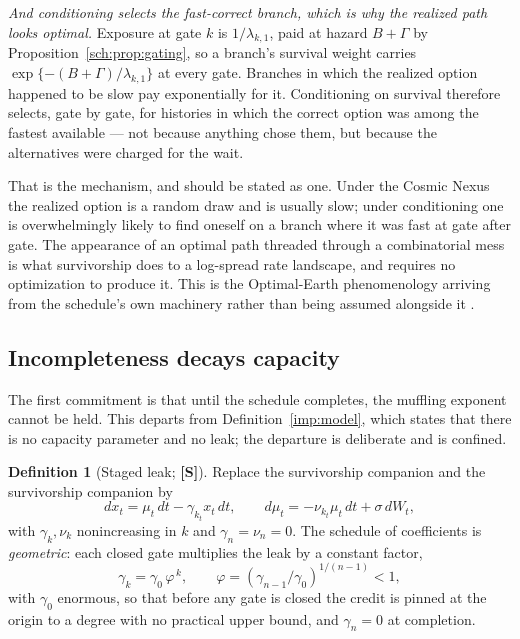 \documentclass[11pt]{article}
\theoremstyle{plain}
\theoremstyle{definition}
\newtheorem{definition}[theorem]{Definition}
\theoremstyle{remark}
\begin{document}
\emph{And conditioning selects the fast-correct branch, which is why the
realized path looks optimal.} Exposure at gate $k$ is $1/\lambda_{k,1}$,
paid at hazard $B+\Gamma$ by Proposition~\ref{sch:prop:gating}, so a
branch's survival weight carries $\exp\{-(B+\Gamma)/\lambda_{k,1}\}$ at
every gate. Branches in which the realized option happened to be slow
pay exponentially for it. Conditioning on survival therefore selects,
gate by gate, for histories in which the correct option was among the
fastest available --- not because anything chose them, but because the
alternatives were charged for the wait.

That is the mechanism, and should be stated as one. Under the Cosmic Nexus the
realized option is a random draw and is usually slow; under conditioning
one is overwhelmingly likely to find oneself on a branch where it was
fast at gate after gate. The appearance of an optimal path threaded
through a combinatorial mess is what survivorship does to a log-spread
rate landscape, and requires no optimization to produce it. This is the
Optimal-Earth phenomenology arriving from the schedule's own machinery
rather than being assumed alongside it \cite{Nexus, Ben26Optimal}.

\subsection{Incompleteness decays capacity}\label{sch:subsub:leak}

The first commitment is that until the schedule completes, the muffling
exponent cannot be held. This departs from
Definition~\ref{imp:model}, which states that there is no capacity
parameter and no leak; the departure is deliberate and is confined.

\begin{definition}[Staged leak; \textbf{[S]}]\label{sch:def:leak}
Replace the survivorship companion \cite{SurvA} and the survivorship companion \cite{SurvA} by
\begin{equation}\label{sch:eq:leak}
dx_t=\mu_t\,dt-\gamma_{k_t}x_t\,dt,
\qquad
d\mu_t=-\nu_{k_t}\mu_t\,dt+\sigma\,dW_t,
\end{equation}
with $\gamma_k,\nu_k$ nonincreasing in $k$ and $\gamma_n=\nu_n=0$. The
schedule of coefficients is \emph{geometric}: each closed gate
multiplies the leak by a constant factor,
\begin{equation}\label{sch:eq:geomleak}
\gamma_k=\gamma_0\,\varphi^{\,k},\qquad
\varphi=(\gamma_{n-1}/\gamma_0)^{1/(n-1)}<1,
\end{equation}
with $\gamma_0$ enormous, so that before any gate is closed the credit
is pinned at the origin to a degree with no practical upper bound, and $\gamma_n=0$ at completion.
\end{definition}
\end{document}
